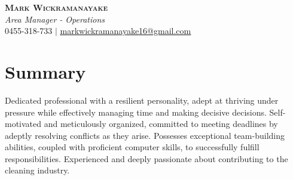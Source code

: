 \documentclass[letterpaper,11pt]{article}
\begin{document}

\begin{center}
    \textbf{\Huge \scshape Mark Wickramanayake} \\ \vspace{1pt}
    \small \textit{Area Manager - Operations} \\
    0455-318-733 $|$ \href{mailto:markwickramanayake16@gmail.com}{\underline{markwickramanayake16@gmail.com}} 
\end{center}

\section*{Summary}
Dedicated professional with a resilient personality, adept at thriving under pressure while effectively managing time and making decisive decisions. Self-motivated and meticulously organized, committed to meeting deadlines by adeptly resolving conflicts as they arise. Possesses exceptional team-building abilities, coupled with proficient computer skills, to successfully fulfill responsibilities. Experienced and deeply passionate about contributing to the cleaning industry.

\end{document}
